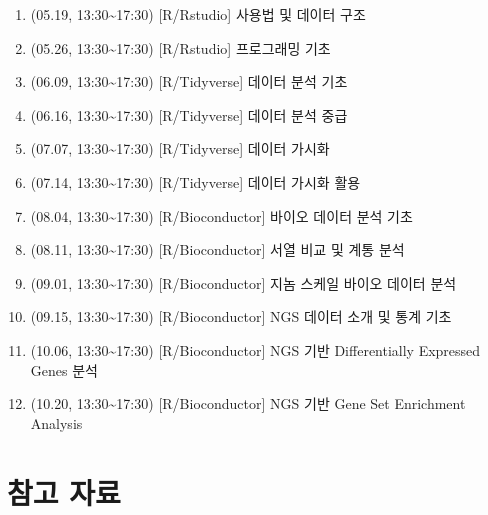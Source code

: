 \documentclass[
]{book}
\providecommand{\tightlist}{%
  \setlength{\itemsep}{0pt}\setlength{\parskip}{0pt}}
\begin{document}
\begin{enumerate}
\def\labelenumi{\arabic{enumi}.}
\tightlist
\item
  (05.19, 13:30\textasciitilde17:30) {[}R/Rstudio{]} 사용법 및 데이터 구조
\item
  (05.26, 13:30\textasciitilde17:30) {[}R/Rstudio{]} 프로그래밍 기초
\item
  (06.09, 13:30\textasciitilde17:30) {[}R/Tidyverse{]} 데이터 분석 기초
\item
  (06.16, 13:30\textasciitilde17:30) {[}R/Tidyverse{]} 데이터 분석 중급\\
\item
  (07.07, 13:30\textasciitilde17:30) {[}R/Tidyverse{]} 데이터 가시화
\item
  (07.14, 13:30\textasciitilde17:30) {[}R/Tidyverse{]} 데이터 가시화 활용
\item
  (08.04, 13:30\textasciitilde17:30) {[}R/Bioconductor{]} 바이오 데이터 분석 기초
\item
  (08.11, 13:30\textasciitilde17:30) {[}R/Bioconductor{]} 서열 비교 및 계통 분석
\item
  (09.01, 13:30\textasciitilde17:30) {[}R/Bioconductor{]} 지놈 스케일 바이오 데이터 분석
\item
  (09.15, 13:30\textasciitilde17:30) {[}R/Bioconductor{]} NGS 데이터 소개 및 통계 기초
\item
  (10.06, 13:30\textasciitilde17:30) {[}R/Bioconductor{]} NGS 기반 Differentially Expressed Genes 분석
\item
  (10.20, 13:30\textasciitilde17:30) {[}R/Bioconductor{]} NGS 기반 Gene Set Enrichment Analysis
\end{enumerate}

\hypertarget{References}{%
\section{참고 자료}\label{References}}
\end{document}
